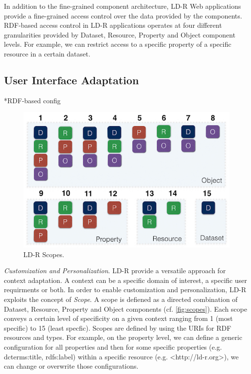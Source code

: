 \documentclass{acm_proc_article-sp}
\begin{document}
In addition to the fine-grained component architecture, LD-R Web applications provide a fine-grained access control over the data provided by the components.
RDF-based access control in LD-R applications operates at four different granularities provided by Dataset, Resource, Property and Object component levels.
For example, we can restrict access to a specific property of a specific resource in a certain dataset.

\subsection{User Interface Adaptation}

*RDF-based config


\begin{figure}[tb]
  \includegraphics[width=.9\linewidth]{images/scopes.jpg}
  \caption{LD-R Scopes.}
  \label{fig:scopes}
\end{figure}

\emph{Customization and Personalization}.
LD-R provide a versatile approach for context adaptation.
A context can be a specific domain of interest, a specific user requirments or both.
In order to enable customization and personalization, LD-R exploits the concept of \emph{Scope}.
A scope is defiened as a directed combination of Dataset, Resource, Property and Object components (cf. \autoref{fig:scopes}).
Each scope conveys a certain level of specificity on a given context ranging from 1 (most specific) to 15 (least specfic).
Scopes are defined by using the URIs for RDF resources and types.
For example, on the property level, we can define a generic configuration for all properties and then for some specific properties (e.g. dcterms:title, rdfs:label) within a specific resource (e.g. <http://ld-r.org>), we can change or overwrite those configurations.
\end{document}

